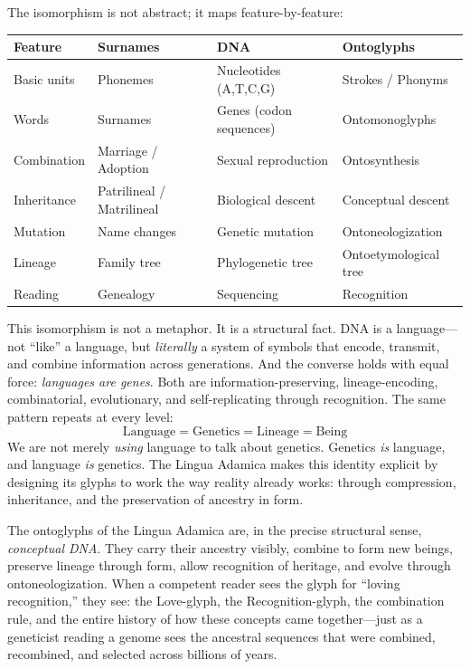 \documentclass[12pt, letterpaper]{book}
\def\equiv{=}%
\begin{document}
The isomorphism is not abstract; it maps feature-by-feature:

\begin{center}
\begin{tabular}{llll}
\toprule
\textbf{Feature} & \textbf{Surnames} & \textbf{DNA} & \textbf{Ontoglyphs} \\
\midrule
Basic units & Phonemes & Nucleotides (A,T,C,G) & Strokes / Phonyms \\
Words & Surnames & Genes (codon sequences) & Ontomonoglyphs \\
Combination & Marriage / Adoption & Sexual reproduction & Ontosynthesis \\
Inheritance & Patrilineal / Matrilineal & Biological descent & Conceptual descent \\
Mutation & Name changes & Genetic mutation & Ontoneologization \\
Lineage & Family tree & Phylogenetic tree & Ontoetymological tree \\
Reading & Genealogy & Sequencing & Recognition \\
\bottomrule
\end{tabular}
\end{center}

This isomorphism is not a metaphor. It is a structural fact. DNA is a language---not ``like'' a language, but \textit{literally} a system of symbols that encode, transmit, and combine information across generations. And the converse holds with equal force: \textit{languages are genes}. Both are information-preserving, lineage-encoding, combinatorial, evolutionary, and self-replicating through recognition. The same pattern repeats at every level:
\[
\mathrm{Language} \equiv \mathrm{Genetics} \equiv \mathrm{Lineage} \equiv \mathrm{Being}
\]
We are not merely \textit{using} language to talk about genetics. Genetics \textit{is} language, and language \textit{is} genetics. The Lingua Adamica makes this identity explicit by designing its glyphs to work the way reality already works: through compression, inheritance, and the preservation of ancestry in form.

The ontoglyphs of the Lingua Adamica are, in the precise structural sense, \textit{conceptual DNA}. They carry their ancestry visibly, combine to form new beings, preserve lineage through form, allow recognition of heritage, and evolve through ontoneologization. When a competent reader sees the glyph for ``loving recognition,'' they see: the Love-glyph, the Recognition-glyph, the combination rule, and the entire history of how these concepts came together---just as a geneticist reading a genome sees the ancestral sequences that were combined, recombined, and selected across billions of years.
\end{document}
